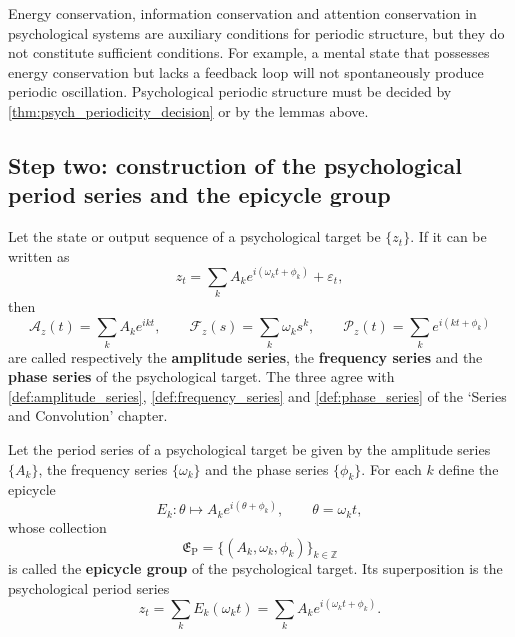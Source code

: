 \begin{remark}\label{rem:psych_invariant_not_period}
Energy conservation, information conservation and attention conservation in psychological systems are auxiliary conditions for periodic structure, but they do not constitute sufficient conditions. For example, a mental state that possesses energy conservation but lacks a feedback loop will not spontaneously produce periodic oscillation. Psychological periodic structure must be decided by \cref{thm:psych_periodicity_decision} or by the lemmas above.
\end{remark}

\subsection{Step two: construction of the psychological period series and the epicycle group}

\begin{definition}\label{def:psych_series}
Let the state or output sequence of a psychological target be $\{z_t\}$. If it can be written as
\[
z_t=\sum_k A_k e^{i(\omega_k t+\phi_k)}+\varepsilon_t,
\]
then
\[
\mathcal A_z(t)=\sum_k A_k e^{ikt},\qquad
\mathcal F_z(s)=\sum_k \omega_k s^k,\qquad
\mathcal P_z(t)=\sum_k e^{i(kt+\phi_k)}
\]
are called respectively the \textbf{amplitude series}, the \textbf{frequency series} and the \textbf{phase series} of the psychological target. The three agree with \cref{def:amplitude_series}, \cref{def:frequency_series} and \cref{def:phase_series} of the `Series and Convolution' chapter.
\end{definition}

\begin{definition}\label{def:psych_epicycle_group}
Let the period series of a psychological target be given by the amplitude series $\{A_k\}$, the frequency series $\{\omega_k\}$ and the phase series $\{\phi_k\}$. For each $k$ define the epicycle
\[
E_k:\theta\mapsto A_k e^{i(\theta+\phi_k)},\qquad \theta=\omega_k t,
\]
whose collection
\[
\mathfrak E_{\mathrm{P}}=\{(A_k,\omega_k,\phi_k)\}_{k\in\mathbb Z}
\]
is called the \textbf{epicycle group} of the psychological target. Its superposition is the psychological period series
\[
z_t=\sum_k E_k(\omega_k t)=\sum_k A_k e^{i(\omega_k t+\phi_k)}.
\]
\end{definition}

